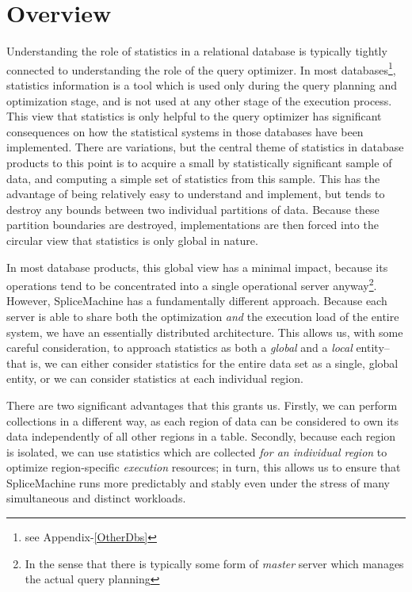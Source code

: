 \newcommand{\collecttablestats}{\texttt{SYSCS\_UTIL.COLLECT\_TABLE\_STATISTICS }}
\newcommand{\collectschemastats}{\texttt{SYSCS\_UTIL.COLLECT\_SCHEMA\_STATISTICS }}
\newcommand{\systablestats}{\texttt{SYS.SYSTABLESTATS }}
\newcommand{\systablestatistics}{\texttt{SYS.SYSTABLESTATISTICS	}}
\newcommand{\syscolumnstats}{\texttt{SYS.SYSCOLUMNSTATS }}
\newcommand{\syscolumnstatistics}{\texttt{SYS.SYSCOLUMNSTATISTICS }}

\section{Overview}
Understanding the role of statistics in a relational database is typically tightly connected to understanding the role of the query optimizer. In most databases\footnote{see Appendix-\ref{OtherDbs}}, statistics information is a tool which is used only during the query planning and optimization stage, and is not used at any other stage of the execution process. This view that statistics is only helpful to the query optimizer has significant consequences on how the statistical systems in those databases have been implemented. There are variations, but the central theme of statistics in database products to this point is to acquire a small by statistically significant sample of data, and computing a simple set of statistics from this sample. This has the advantage of being relatively easy to understand and implement, but tends to destroy any bounds between two individual partitions of data. Because these partition boundaries are destroyed, implementations are then forced into the circular view that statistics is only global in nature.

In most database products, this global view has a minimal impact, because its operations tend to be concentrated into a single operational server anyway\footnote{In the sense that there is typically some form of \emph{master} server which manages the actual query planning}. However, SpliceMachine has a fundamentally different approach. Because each server is able to share both the optimization \emph{and} the execution load of the entire system, we have an essentially distributed architecture. This allows us, with some careful consideration, to approach statistics as both a \emph{global} and a \emph{local} entity--that is, we can either consider statistics for the entire data set as a single, global entity, or we can consider statistics at each individual region. 

There are two significant advantages that this grants us. Firstly, we can perform collections in a different way, as each region of data can be considered to own its data independently of all other regions in a table. Secondly, because each region is isolated, we can use statistics which are collected \emph{for an individual region} to optimize region-specific \emph{execution} resources; in turn, this allows us to ensure that SpliceMachine runs more predictably and stably even under the stress of many simultaneous and distinct workloads.

